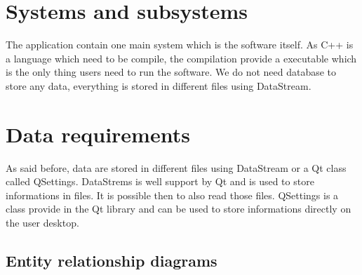 \section{Systems and subsystems}
The application contain one main system which is the software itself. As C++ is a language which need to be compile, the compilation provide a executable which is the only thing users need to run the software.
We do not need database to store any data, everything is stored in different files using DataStream.  

\section{Data requirements}
As said before, data are stored in different files using DataStream or a Qt class called QSettings. DataStrems is well support by Qt and is used to store informations in files. It is possible then to also read those files. QSettings is a class provide in the Qt library and can be used to store informations directly on the user desktop.

\subsection{Entity relationship diagrams}

